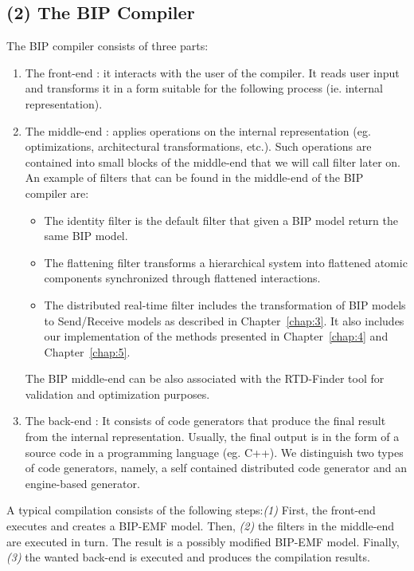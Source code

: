 \subsection*{(2) The BIP Compiler}
The BIP compiler consists of three parts:
\begin{enumerate}
  \item The front-end : it interacts with the user of the compiler. It reads user input and 
    transforms it in a form suitable for the following process (ie. internal representation).
  \item The middle-end : applies operations on the internal representation 
    (eg. optimizations, architectural transformations, etc.). Such operations are contained 
    into small blocks of the middle-end that we will call filter later on. 
    An example of filters that can be found in the middle-end of the BIP compiler are:
    \begin{itemize}
      \item The identity filter is the default filter that given a BIP model return the
        same BIP model.
      \item The flattening filter transforms a hierarchical system into flattened 
        atomic components synchronized through flattened interactions.
      \item The distributed real-time filter includes the transformation of BIP models
        to Send/Receive models as described in Chapter~\ref{chap:3}. It also includes
        our implementation of the methods presented in Chapter~\ref{chap:4} and
        Chapter~\ref{chap:5}.
    \end{itemize}
    The BIP middle-end can be also associated with the RTD-Finder tool for validation
    and optimization purposes. 
  \item The back-end : It consists of code generators that produce the final result from the 
    internal representation. Usually, the final output is in the form of a source code in a 
    programming language (eg. C++). We distinguish two types of code generators, namely,
    a self contained distributed code generator and an engine-based generator. 
\end{enumerate}

A typical compilation consists of the following steps:\emph{(1)} First, the front-end 
executes and creates a BIP-EMF model. Then, \emph{(2)} the filters in the middle-end are 
executed in turn. The result is a possibly modified BIP-EMF model. Finally, \emph{(3)} 
the wanted back-end is executed and produces the compilation results.


